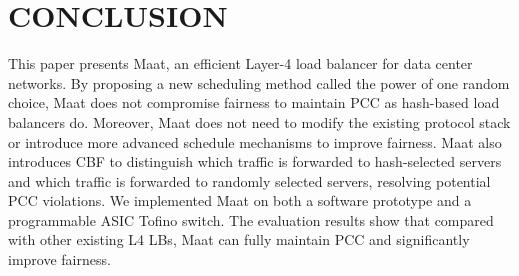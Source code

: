 \section{CONCLUSION}
This paper presents Maat, an efficient Layer-4 load balancer for data center networks. By proposing a new scheduling method called the power of one random choice, Maat does not compromise fairness to maintain PCC as hash-based load balancers do. Moreover, Maat does not need to modify the existing protocol stack or introduce more advanced schedule mechanisms to improve fairness. Maat also introduces CBF to distinguish which traffic is forwarded to hash-selected servers and which traffic is forwarded to randomly selected servers, resolving potential PCC violations. We implemented Maat on both a software prototype and a programmable ASIC Tofino switch. The evaluation results show that compared with other existing L4 LBs, Maat can fully maintain PCC and significantly improve fairness.